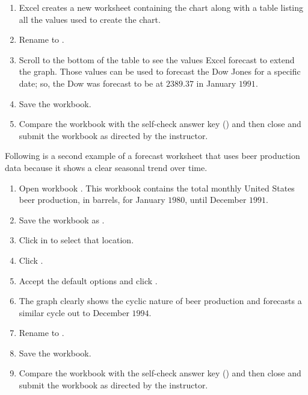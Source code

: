 \begin{enumbox}
\begin{enumerate}
		\item Excel creates a new worksheet containing the chart along with a table listing all the values used to create the chart.
		\item Rename  to .
		\item Scroll to the bottom of the table to see the values Excel forecast to extend the graph. Those values can be used to forecast the Dow Jones for a specific date; so, the Dow was forecast to be at $ 2389.37 $ in January $ 1991 $.
		
		\item Save the  workbook.
		\item Compare the workbook with the self-check answer key () and then close and submit the  workbook as directed by the instructor.
	
	\end{enumerate}
\end{enumbox}

Following is a second example of a forecast worksheet that uses beer production data because it shows a clear seasonal trend over time.

\begin{enumbox}
	\begin{enumerate}
		\item Open workbook . This workbook contains the total monthly United States beer production, in barrels, for January $ 1980 $, until December $ 1991 $. 
		\item Save the workbook as .
		\item Click in  to select that location.
		\item Click .
		\item Accept the default options and click .
		\item The graph clearly shows the cyclic nature of beer production and forecasts a similar cycle out to December $ 1994 $.
		\item Rename  to .
		\item Save the  workbook.
		\item Compare the workbook with the self-check answer key () and then close and submit the  workbook as directed by the instructor.
	\end{enumerate}
\end{enumbox}

